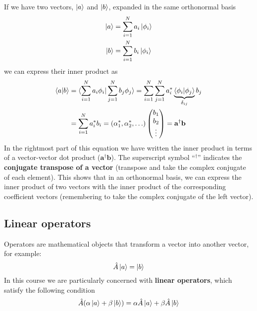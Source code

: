 \documentclass[../Main/chem532-notes.tex]{subfiles}
\begin{document}
If we have two vectors, $\ket{a}$ and $\ket{b}$, expanded in the same orthonormal basis
\begin{equation}
\begin{split}
\ket{a} &= \sum_{i = 1}^N a_i \ket{\phi_i} \\
\ket{b} &= \sum_{i = 1}^N b_i \ket{\phi_i}
\end{split}
\end{equation}
we can express their inner product as
\begin{equation}
\begin{split}
\braket{a|b} &= \braket{\sum_{i = 1}^N a_i \phi_i | \sum_{j = 1}^N b_j \phi_j }
= \sum_{i = 1}^N  \sum_{j = 1}^N a_i^*  \underbrace{\braket{ \phi_i | \phi_j }}_{\delta_{ij}} b_j \\
&= \sum_{i = 1}^N a_i^* b_i = (\alpha^*_1, \alpha^*_2,\ldots)
\begin{pmatrix}
b_1 \\
b_2 \\
\vdots
\end{pmatrix} = 
  \mathbf{a}^\dagger\mathbf{b}
\end{split}
\end{equation}
In the rightmost part of this equation we have written the inner product in terms of a vector-vector dot product ($\mathbf{a}^\dagger \mathbf{b}$). The superscript symbol ``${}^\dagger$'' indicates the \textbf{conjugate transpose of a vector} (transpose and take the complex conjugate of each element). This shows that in an orthonormal basis, we can express the inner product of two vectors with the inner product of the corresponding coefficient vectors (remembering to take the complex conjugate of the left vector). 

\subsection{Linear operators}
Operators are mathematical objects that transform a vector into another vector, for example:
\begin{equation}
\label{eq:bg:operator}
\hat{A} \ket{a} = \ket{b}
\end{equation}
In this course we are particularly concerned with \textbf{linear operators}, which satisfy the following condition
\begin{equation}
\hat{A} (\alpha \ket{a} + \beta \ket{b}) = \alpha \hat{A} \ket{a} + \beta \hat{A} \ket{b}
\end{equation}
\end{document}
